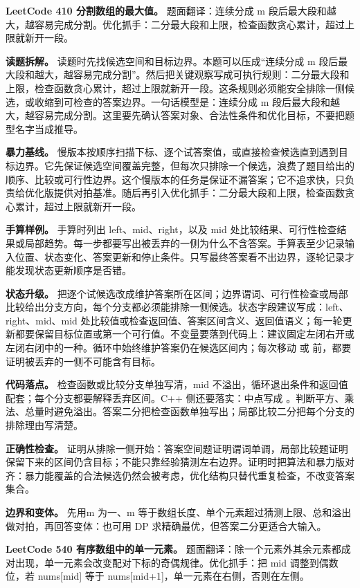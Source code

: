 \noindent\textbf{LeetCode 410 分割数组的最大值。} 题面翻译：连续分成 m 段后最大段和越大，越容易完成分割。优化抓手：二分最大段和上限，检查函数贪心累计，超过上限就新开一段。

\textbf{读题拆解。} 读题时先找候选空间和目标边界。本题可以压成“连续分成 m 段后最大段和越大，越容易完成分割”。然后把关键观察写成可执行规则：二分最大段和上限，检查函数贪心累计，超过上限就新开一段。这条规则必须能安全排除一侧候选，或收缩到可检查的答案边界。一句话模型是：连续分成 m 段后最大段和越大，越容易完成分割。这里要先确认答案对象、合法性条件和优化目标，不要把题型名字当成推导。

\textbf{暴力基线。} 慢版本按顺序扫描下标、逐个试答案值，或直接检查候选直到遇到目标边界。它先保证候选空间覆盖完整，但每次只排除一个候选，浪费了题目给出的顺序、比较或可行性边界。这个慢版本的任务是保证不漏答案；它不追求快，只负责给优化版提供对拍基准。随后再引入优化抓手：二分最大段和上限，检查函数贪心累计，超过上限就新开一段。

\textbf{手算样例。} 手算时列出 left、mid、right，以及 mid 处比较结果、可行性检查结果或局部趋势。每一步都要写出被丢弃的一侧为什么不含答案。手算表至少记录输入位置、状态变化、答案更新和停止条件。只写最终答案看不出边界，逐轮记录才能发现状态更新顺序是否错。

\textbf{状态升级。} 把逐个试候选改成维护答案所在区间；边界谓词、可行性检查或局部比较给出分支方向，每个分支都必须能排除一侧候选。状态字段建议写成：left、right、mid、mid 处比较值或检查返回值、答案区间含义、返回值语义；每一轮更新都要保留目标位置或第一个可行值。不变量要落到代码上：建议固定左闭右开或左闭右闭中的一种。循环中始终维护答案仍在候选区间内；每次移动  或  前，都要证明被丢弃的一侧不可能含有目标。

\textbf{代码落点。} 检查函数或比较分支单独写清，mid 不溢出，循环退出条件和返回值配套；每个分支都要解释丢弃区间。C++ 侧还要落实：中点写成 。判断平方、乘法、总量时避免溢出。答案二分把检查函数单独写出；局部比较二分把每个分支的排除理由写清楚。

\textbf{正确性检查。} 证明从排除一侧开始：答案空间题证明谓词单调，局部比较题证明保留下来的区间仍含目标；不能只靠经验猜测左右边界。证明时把算法和暴力版对齐：暴力能覆盖的合法候选仍然会被考虑，优化结构只替代重复检查，不改变答案集合。

\textbf{边界和变体。} 先用m 为一、m 等于数组长度、单个元素超过猜测上限、总和溢出做对拍，再回答变体：也可用 DP 求精确最优，但答案二分更适合大输入。

\noindent\textbf{LeetCode 540 有序数组中的单一元素。} 题面翻译：除一个元素外其余元素都成对出现，单一元素会改变配对下标的奇偶规律。优化抓手：把 mid 调整到偶数位，若 nums[mid] 等于 nums[mid+1]，单一元素在右侧，否则在左侧。

